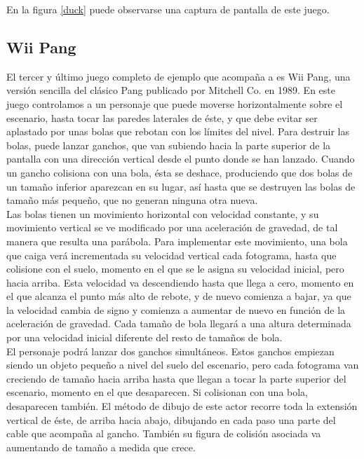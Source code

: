 En la figura \ref{duck} puede observarse una captura de pantalla de este juego.\\


\subsection{Wii Pang}

El tercer y último juego completo de ejemplo que acompaña a  es Wii Pang, una versión sencilla del clásico Pang publicado por Mitchell Co. en 1989. En este juego controlamos a un personaje que puede moverse horizontalmente sobre el escenario, hasta tocar las paredes laterales de éste, y que debe evitar ser aplastado por unas bolas que rebotan con los límites del nivel. Para destruir las bolas, puede lanzar ganchos, que van subiendo hacia la parte superior de la pantalla con una dirección vertical desde el punto donde se han lanzado. Cuando un gancho colisiona con una bola, ésta se deshace, produciendo que dos bolas de un tamaño inferior aparezcan en su lugar, así hasta que se destruyen las bolas de tamaño más pequeño, que no generan ninguna otra nueva.\\

Las bolas tienen un movimiento horizontal con velocidad constante, y su movimiento vertical se ve modificado por una aceleración de gravedad, de tal manera que resulta una parábola. Para implementar este movimiento, una bola que caiga verá incrementada su velocidad vertical cada fotograma, hasta que colisione con el suelo, momento en el que se le asigna su velocidad inicial, pero hacia arriba. Esta velocidad va descendiendo hasta que llega a cero, momento en el que alcanza el punto más alto de rebote, y de nuevo comienza a bajar, ya que la velocidad cambia de signo y comienza a aumentar de nuevo en función de la aceleración de gravedad. Cada tamaño de bola llegará a una altura determinada por una velocidad inicial diferente del resto de tamaños de bola.\\

El personaje podrá lanzar dos ganchos simultáneos. Estos ganchos empiezan siendo un objeto pequeño a nivel del suelo del escenario, pero cada fotograma van creciendo de tamaño hacia arriba hasta que llegan a tocar la parte superior del escenario, momento en el que desaparecen. Si colisionan con una bola, desaparecen también. El método de dibujo de este actor recorre toda la extensión vertical de éste, de arriba hacia abajo, dibujando en cada paso una parte del cable que acompaña al gancho. También su figura de colisión asociada va aumentando de tamaño a medida que crece.\\

